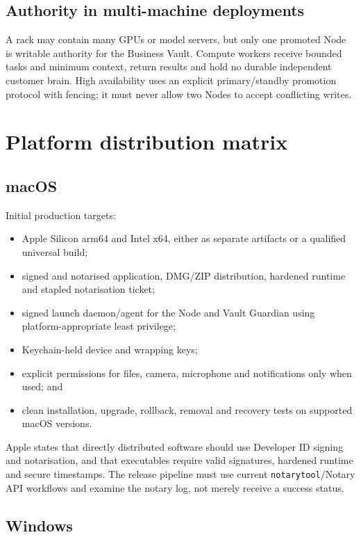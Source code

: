 \documentclass[11pt]{article}
\newcommand{\code}[1]{\texttt{#1}}
\begin{document}
\subsection{Authority in multi-machine deployments}

A rack may contain many GPUs or model servers, but only one promoted Node is writable authority for the Business Vault. Compute workers receive bounded tasks and minimum context, return results and hold no durable independent customer brain. High availability uses an explicit primary/standby promotion protocol with fencing; it must never allow two Nodes to accept conflicting writes.

\section{Platform distribution matrix}

\subsection{macOS}

Initial production targets:

\begin{itemize}
  \item Apple Silicon arm64 and Intel x64, either as separate artifacts or a qualified universal build;
  \item signed and notarised application, DMG/ZIP distribution, hardened runtime and stapled notarisation ticket;
  \item signed launch daemon/agent for the Node and Vault Guardian using platform-appropriate least privilege;
  \item Keychain-held device and wrapping keys;
  \item explicit permissions for files, camera, microphone and notifications only when used; and
  \item clean installation, upgrade, rollback, removal and recovery tests on supported macOS versions.
\end{itemize}

Apple states that directly distributed software should use Developer ID signing and notarisation, and that executables require valid signatures, hardened runtime and secure timestamps. The release pipeline must use current \code{notarytool}/Notary API workflows and examine the notary log, not merely receive a success status.

\subsection{Windows}
\end{document}
